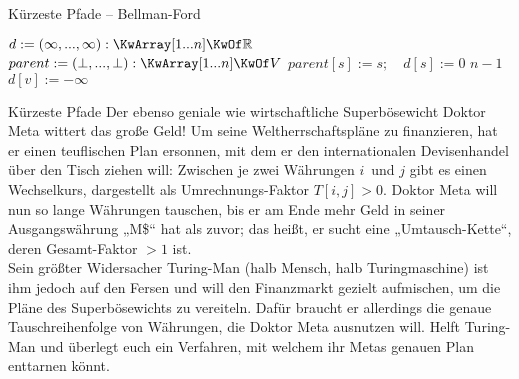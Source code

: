 \begin{frame}{Kürzeste Pfade – Bellman-Ford}
	\begin{exampleblock}{}
		\begin{algorithm}[H]
			\small
			 {
				$d := (\infty, ..., \infty) : \KwArray[1...n] \KwOf \R$\;
				$parent := (\bot, ..., \bot) : \KwArray[1...n] \KwOf V$\;
				$parent[s] := s ; \quad d[s] := 0$ \;
				 $n-1$  
				 {
					 {
						$d[v] := -\infty$\;
					}
				}
				\;
			}
		\end{algorithm}
	\end{exampleblock}
\end{frame}

\begin{frame}{Kürzeste Pfade}
	Der ebenso geniale wie wirtschaftliche Superbösewicht Doktor Meta wittert das große Geld! Um seine Weltherrschaftspläne zu finanzieren, hat er einen teuflischen Plan ersonnen, mit dem er den internationalen Devisenhandel über den Tisch ziehen will: Zwischen je zwei Währungen $i$~und $j$ gibt es einen Wechselkurs, dargestellt als Umrechnungs-Faktor $T[i,j] > 0$. Doktor Meta will nun so lange Währungen tauschen, bis er am Ende mehr Geld in seiner Ausgangswährung „M\$“ hat als zuvor; das heißt, er sucht eine „Umtausch-Kette“, deren Gesamt-Faktor $> 1$ ist. \\
	\smallskip
	Sein größter Widersacher Turing-Man {\small (halb Mensch, halb Turingmaschine)} ist ihm jedoch auf den Fersen und will den Finanzmarkt gezielt aufmischen, um die Pläne des Superbösewichts zu vereiteln. Dafür braucht er allerdings die genaue Tauschreihenfolge von Währungen, die Doktor Meta ausnutzen will. Helft Turing-Man und  überlegt euch ein Verfahren, mit welchem ihr Metas genauen Plan enttarnen könnt.
\end{frame}

